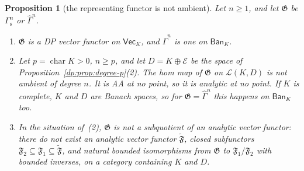 \documentclass[11pt]{amsart}
\newtheorem{proposition}[theorem]{Proposition}
\theoremstyle{definition}
\theoremstyle{remark}
\numberwithin{equation}{section}
\newcommand{\cL}{\mathcal L}
\theoremstyle{plain}
\theoremstyle{definition}
\theoremstyle{plain}
\newcommand{\hGamma}{\widehat\Gamma}
\begin{document}
\begin{proposition}[the representing functor is not ambient]\label{dp:prop:gamma-not-ambient}
Let $n\ge1$, and let $\mathfrak G$ be $\Gamma^n_{\mathrm s}$ or $\hGamma^n$.
\begin{enumerate}
\item $\mathfrak G$ is a DP vector functor on $\mathsf{Vec}_K$, and $\hGamma^n$ is one on $\mathsf{Ban}_K$.
\item Let $p=\operatorname{char}K>0$, $n\ge p$, and let $D=K\oplus\mathcal E$ be the space of Proposition~\ref{dp:prop:degree-p}\textup{(2)}. The hom map of $\mathfrak G$ on $\cL(K,D)$ is not ambient of degree $n$. It is AA at no point, so it is analytic at no point. If $K$ is complete, $K$ and $D$ are Banach spaces, so for $\mathfrak G=\hGamma^n$ this happens on $\mathsf{Ban}_K$ too.
\item In the situation of~\textup{(2)}, $\mathfrak G$ is not a subquotient of an analytic vector functor: there do not exist an analytic vector functor $\widetilde{\mathfrak F}$, closed subfunctors $\mathfrak F_2\subseteq\mathfrak F_1\subseteq\widetilde{\mathfrak F}$, and natural bounded isomorphisms from $\mathfrak G$ to $\mathfrak F_1/\mathfrak F_2$ with bounded inverses, on a category containing $K$ and $D$.
\end{enumerate}
\end{proposition}
\end{document}

